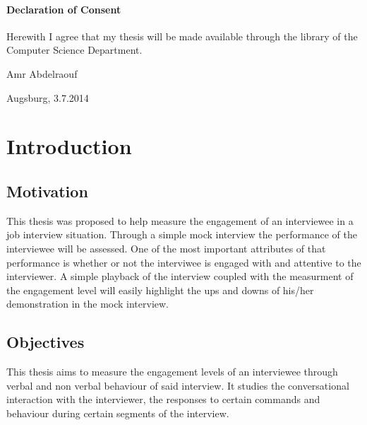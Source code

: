 \documentclass[12pt, a4paper, fleqn]{memoir}%
\begin{document}
\subsubsection*{\LARGE Declaration of Consent}
Herewith I agree that my thesis will be made available through the library of the Computer Science Department.
\vfill
\begin{flushleft}
Amr Abdelraouf
\end{flushleft}  
\begin{flushright}
Augsburg, 3.7.2014 
\end{flushright}
\vfill

\cleardoublepage
\rmfamily
\normalfont
{}
\pagestyle{headings}
\tableofcontents


\mainmatter

\chapter{Introduction}
\label{chap:Introduction}

\section{Motivation}
\label{sec:Motivation}
This thesis was proposed to help measure the engagement of an interviewee in a job interview situation. Through a simple mock interview the performance of the interviewee will be assessed. One of the most important attributes of that performance is whether or not the interviwee is engaged with and attentive to the interviewer. A simple playback of the interview coupled with the measurment of the engagement level will easily highlight the ups and downs of his/her demonstration in the mock interview.

\section{Objectives}
\label{sec:Objectives}
This thesis aims to measure the engagement levels of an interviewee through verbal and non verbal behaviour of said interview. It studies the conversational interaction with the interviewer, the responses to certain commands and behaviour during certain segments of the interview.
\end{document}
